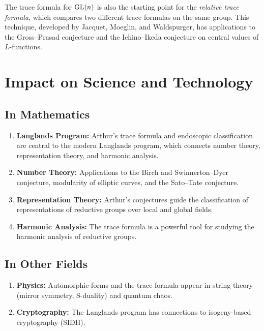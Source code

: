 \begin{remark}
The trace formula for $\operatorname{GL}(n)$ is also the starting point for the \emph{relative trace formula}, which compares two different trace formulas on the same group. This technique, developed by Jacquet, Moeglin, and Waldspurger, has applications to the Gross--Prasad conjecture and the Ichino--Ikeda conjecture on central values of $L$-functions.
\end{remark}

\section{Impact on Science and Technology}

\subsection{In Mathematics}

\begin{enumerate}
    \item \textbf{Langlands Program:} Arthur's trace formula and endoscopic classification are central to the modern Langlands program, which connects number theory, representation theory, and harmonic analysis.
    \item \textbf{Number Theory:} Applications to the Birch and Swinnerton--Dyer conjecture, modularity of elliptic curves, and the Sato--Tate conjecture.
    \item \textbf{Representation Theory:} Arthur's conjectures guide the classification of representations of reductive groups over local and global fields.
    \item \textbf{Harmonic Analysis:} The trace formula is a powerful tool for studying the harmonic analysis of reductive groups.
\end{enumerate}

\subsection{In Other Fields}

\begin{enumerate}
    \item \textbf{Physics:} Automorphic forms and the trace formula appear in string theory (mirror symmetry, S-duality) and quantum chaos.
    \item \textbf{Cryptography:} The Langlands program has connections to isogeny-based cryptography (SIDH).
\end{enumerate}

